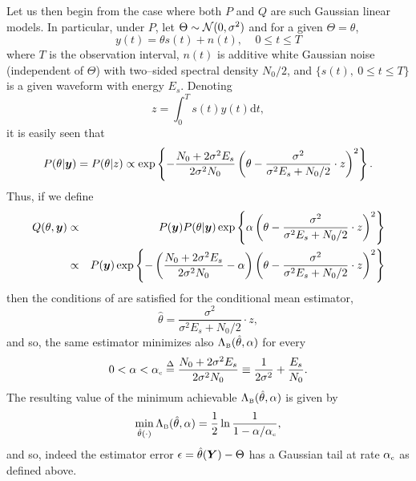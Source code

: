 \documentclass[11pt,epsf]{article}
\newcommand {\dfn} {\stackrel{\Delta} {=}}
\newcommand{\ct}{\hat{\theta}}
\newcommand {\by} {\mbox{\boldmath $y$}}
\newcommand {\bY} {\mbox{\boldmath $Y$}}
\newcommand{\calN}{{\cal N}}
\begin{document}
Let us then begin from the case where both $P$ and $Q$ are such Gaussian linear models.
In particular, under $P$, let $\Theta\sim \calN(0,\sigma^2)$ and for a given
$\Theta=\theta$, 
\begin{equation}
\label{ref}
y(t)=\theta s(t)+n(t),~~~~~0\le t\le T
\end{equation}
where $T$ is the observation interval,
$n(t)$ is additive white Gaussian noise (independent of $\Theta$)
with two--sided spectral density $N_0/2$, and
$\{s(t),~0\le t\le T\}$ is a given waveform with energy $E_s$.
Denoting 
\begin{equation}
z=\int_0^Ts(t)y(t)\mbox{d}t,
\end{equation}
it is easily seen that
\begin{equation}
P(\theta|\by) = P(\theta|z) \propto
\exp\left\{-\frac{N_0+2\sigma^2E_s}{2\sigma^2N_0}\left(\theta-
\frac{\sigma^2}{\sigma^2E_s+N_0/2}\cdot z\right)^2\right\}.
\end{equation}
Thus, if we define 
\begin{eqnarray}
Q(\theta,\by)&\propto&P(\by)P(\theta|\by)\exp\left\{\alpha\left(\theta-
\frac{\sigma^2}{\sigma^2E_s+N_0/2}\cdot z\right)^2\right\}\\
&\propto&P(\by)\exp\left\{-\left(\frac{N_0+2\sigma^2E_s}{2\sigma^2N_0}-\alpha\right)
\left(\theta-\frac{\sigma^2}{\sigma^2E_s+N_0/2}\cdot z\right)^2\right\}
\end{eqnarray}
then the conditions of \cite[Observation 1]{p143} are satisfied for the conditional mean
estimator,
\begin{equation}
\label{condmean}
\ct= \frac{\sigma^2}{\sigma^2E_s+N_0/2}\cdot z,
\end{equation}
and so, the same estimator minimizes also $\Lambda_{\mbox{\tiny
B}}(\ct,\alpha)$ for every
\begin{equation}
0< \alpha < \alpha_{\mbox{\tiny c}}\dfn\frac{N_0+2\sigma^2E_s}{2\sigma^2N_0}
\equiv\frac{1}{2\sigma^2}+\frac{E_s}{N_0}.
\end{equation}
The resulting value of the minimum achievable 
$\Lambda_{\mbox{\tiny B}}(\ct,\alpha)$ is given by
\begin{equation}
\min_{\ct(\cdot)}\Lambda_{\mbox{\tiny B}}(\ct,\alpha)=
\frac{1}{2}\ln\frac{1}{1-\alpha/\alpha_{\mbox{\tiny c}}},
\end{equation}
and so, indeed the estimator error $\epsilon=\ct(\bY)-\Theta$ has a Gaussian
tail at rate $\alpha_{\mbox{\tiny c}}$ as defined above.
\end{document}
